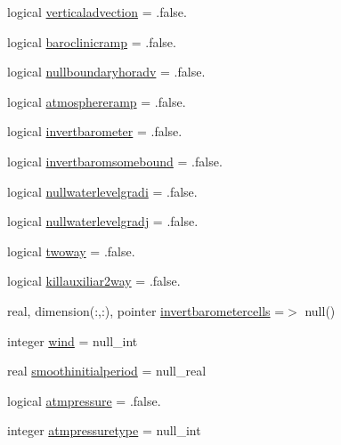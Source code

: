 \begin{DoxyCompactItemize}
\item 
logical \mbox{\hyperlink{structmodulehydrodynamic_1_1t__hydrooptions_a6b881ad521552e543ed417e56035d495}{verticaladvection}} = .false.
\item 
logical \mbox{\hyperlink{structmodulehydrodynamic_1_1t__hydrooptions_a856df04ee450910fec3329b944f37615}{baroclinicramp}} = .false.
\item 
logical \mbox{\hyperlink{structmodulehydrodynamic_1_1t__hydrooptions_a4ca293676441364487d2885b8a9592cd}{nullboundaryhoradv}} = .false.
\item 
logical \mbox{\hyperlink{structmodulehydrodynamic_1_1t__hydrooptions_af5114fa46b31010603930b25a9ca89e6}{atmosphereramp}} = .false.
\item 
logical \mbox{\hyperlink{structmodulehydrodynamic_1_1t__hydrooptions_a0df672038603309fc79c008093b34c05}{invertbarometer}} = .false.
\item 
logical \mbox{\hyperlink{structmodulehydrodynamic_1_1t__hydrooptions_a04f269cb57bdc8b828feb1ab8c9560b0}{invertbaromsomebound}} = .false.
\item 
logical \mbox{\hyperlink{structmodulehydrodynamic_1_1t__hydrooptions_a776990a3bf91103fd9d95b74e33c9a5b}{nullwaterlevelgradi}} = .false.
\item 
logical \mbox{\hyperlink{structmodulehydrodynamic_1_1t__hydrooptions_ae97d855e1dd08d07bb94f17a9a408403}{nullwaterlevelgradj}} = .false.
\item 
logical \mbox{\hyperlink{structmodulehydrodynamic_1_1t__hydrooptions_afa3717a0b22a11bf8b5ee6d5049d599b}{twoway}} = .false.
\item 
logical \mbox{\hyperlink{structmodulehydrodynamic_1_1t__hydrooptions_aa36073898096dca4ada0e324249c8a67}{killauxiliar2way}} = .false.
\item 
real, dimension(\+:,\+:), pointer \mbox{\hyperlink{structmodulehydrodynamic_1_1t__hydrooptions_afdaf65fb53b9f7b8a3b6a7c129e7b680}{invertbarometercells}} =$>$ null()
\item 
integer \mbox{\hyperlink{structmodulehydrodynamic_1_1t__hydrooptions_a4677e99b8c6b3e318898aeff52b7417c}{wind}} = null\+\_\+int
\item 
real \mbox{\hyperlink{structmodulehydrodynamic_1_1t__hydrooptions_a0f7d320a97d8af017178b19fd31ddcf9}{smoothinitialperiod}} = null\+\_\+real
\item 
logical \mbox{\hyperlink{structmodulehydrodynamic_1_1t__hydrooptions_a7744cbf7b1c5d528ee19dae68d577de0}{atmpressure}} = .false.
\item 
integer \mbox{\hyperlink{structmodulehydrodynamic_1_1t__hydrooptions_a2381f027cbc1fd3622f9c42dec4d48d2}{atmpressuretype}} = null\+\_\+int

\end{DoxyCompactItemize}
